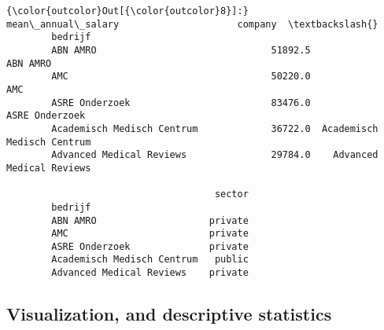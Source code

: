 \documentclass[11pt]{article}
\begin{document}
\begin{Verbatim}[commandchars=\\\{\}]
{\color{outcolor}Out[{\color{outcolor}8}]:}                             mean\_annual\_salary                     company  \textbackslash{}
        bedrijf                                                                      
        ABN AMRO                               51892.5                    ABN AMRO   
        AMC                                    50220.0                         AMC   
        ASRE Onderzoek                         83476.0              ASRE Onderzoek   
        Academisch Medisch Centrum             36722.0  Academisch Medisch Centrum   
        Advanced Medical Reviews               29784.0    Advanced Medical Reviews   
        
                                     sector  
        bedrijf                              
        ABN AMRO                    private  
        AMC                         private  
        ASRE Onderzoek              private  
        Academisch Medisch Centrum   public  
        Advanced Medical Reviews    private  
\end{Verbatim}
            
    \subsection{Visualization, and descriptive
statistics}\label{visualization-and-descriptive-statistics}
\end{document}
